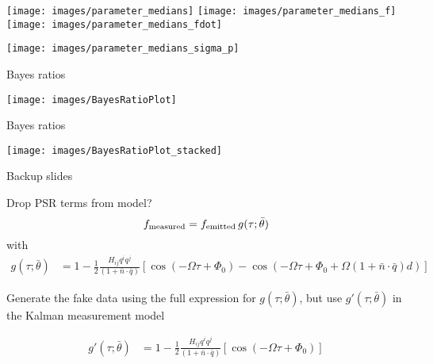 \documentclass[10pt]{beamer}
\begin{document}
	\begin{frame}
	
	
	\texttt{[image: images/parameter\_medians]}
	\texttt{[image: images/parameter\_medians\_f]}
	\texttt{[image: images/parameter\_medians\_fdot]}
	
	
	
\end{frame}

	\begin{frame}	
	\centering
	\texttt{[image: images/parameter\_medians\_sigma\_p]}
\end{frame}




\begin{frame}{Bayes ratios}


\texttt{[image: images/BayesRatioPlot]}


\end{frame}


\begin{frame}{Bayes ratios}
	
	
	\texttt{[image: images/BayesRatioPlot\_stacked]}
	
	
\end{frame}


\begin{frame}[standout]
	Backup slides
\end{frame}

\appendix



\begin{frame}{Drop PSR terms from model?}
	\begin{equation}
		f_{\rm measured} = f_{\rm emitted} \, g(\tau; \bar{\theta})
		\label{eq:measureent}
	\end{equation}
	with
	\begin{align}
		g(\tau; \bar{\theta}) 
		& = 1 - \frac{1}{2} \frac{ H_{ij}q^i q^j }{(1 + \bar{n}\cdot \bar{q}) } \left[ \cos(-\Omega \tau +\Phi_0) - \cos(-\Omega \tau +\Phi_0 + \Omega (1 + \bar{n}\cdot \bar{q})  d) \right]
	\end{align}
	
	Generate the fake data using the full expression for $g(\tau; \bar{\theta})$, but use $g'(\tau; \bar{\theta})$ in the Kalman measurement model
	
	\begin{align}
		g'(\tau; \bar{\theta}) 
		& = 1 - \frac{1}{2} \frac{ H_{ij}q^i q^j }{(1 + \bar{n}\cdot \bar{q}) } \left[ \cos(-\Omega \tau +\Phi_0) \right]
	\end{align}
\end{frame}
\end{document}
